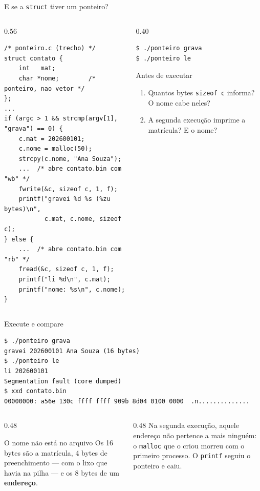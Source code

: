 \documentclass[aspectratio=169]{beamer}
\begin{document}
\begin{frame}[fragile]{E se a \texttt{struct} tiver um ponteiro?}
  \vspace{-0.9em}
  \begin{columns}[T]
    \begin{column}{0.56\textwidth}
\begin{lstlisting}[style=codCs]
/* ponteiro.c (trecho) */
struct contato {
    int   mat;
    char *nome;        /* ponteiro, nao vetor */
};
...
if (argc > 1 && strcmp(argv[1], "grava") == 0) {
    c.mat = 202600101;
    c.nome = malloc(50);
    strcpy(c.nome, "Ana Souza");
    ...  /* abre contato.bin com "wb" */
    fwrite(&c, sizeof c, 1, f);
    printf("gravei %d %s (%zu bytes)\n",
           c.mat, c.nome, sizeof c);
} else {
    ...  /* abre contato.bin com "rb" */
    fread(&c, sizeof c, 1, f);
    printf("li %d\n", c.mat);
    printf("nome: %s\n", c.nome);
}
\end{lstlisting}
    \end{column}
    \begin{column}{0.40\textwidth}
\begin{lstlisting}[style=shellS]
$ ./ponteiro grava
$ ./ponteiro le
\end{lstlisting}
      \begin{block}{Antes de executar}
        \small
        \begin{enumerate}
          \item Quantos bytes \texttt{sizeof c} informa? O nome cabe neles?
          \item A segunda execução imprime a matrícula? E o nome?
        \end{enumerate}
      \end{block}
    \end{column}
  \end{columns}
\end{frame}

\begin{frame}[fragile]{Execute e compare}
\begin{lstlisting}[style=shellStyle]
$ ./ponteiro grava
gravei 202600101 Ana Souza (16 bytes)
$ ./ponteiro le
li 202600101
Segmentation fault (core dumped)
$ xxd contato.bin
00000000: a56e 130c ffff ffff 909b 8d04 0100 0000  .n..............
\end{lstlisting}
  \begin{columns}[T]
    \begin{column}{0.48\textwidth}
      \begin{block}{O nome não está no arquivo}
        \small Os 16 bytes são a matrícula, 4 bytes de preenchimento --- com
        o lixo que havia na pilha --- e os 8 bytes de um
        \textbf{endereço}.
      \end{block}
    \end{column}
    \begin{column}{0.48\textwidth}
      \small Na segunda execução, aquele endereço não pertence a mais
      ninguém: o \texttt{malloc} que o criou morreu com o primeiro processo.
      O \texttt{printf} seguiu o ponteiro e caiu.
    \end{column}
  \end{columns}
\end{frame}
\end{document}
